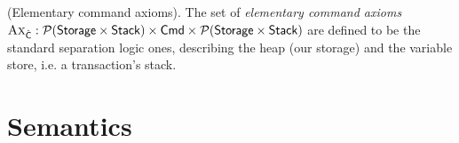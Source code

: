 \begin{defn}
	(Elementary command axioms).
	The set of \emph{elementary command axioms} $\textsc{Ax}_{\hat{\mathsf{C}}} : \mathcal{P}(\mathsf{Storage} \times \mathsf{Stack}) \times \mathsf{Cmd} \times \mathcal{P}(\mathsf{Storage} \times \mathsf{Stack})$ are defined to be the standard separation logic ones, describing the heap (our storage) and the variable store, i.e. a transaction's stack.

	\iffalse	
	For every rule's triple $\Delta \vdash \triple{P}{\hat{\mathds{C}}}{Q}$, logical environment $e \in \mathsf{LEnv}$ and predicate environment $\delta \in \mathsf{PEnv}$, we define the corresponding axiom as $\lfloor \tsem{P}_{e, \delta} \rfloor_W \times \hat{\mathds{C}} \times \lfloor \tsem{Q}_{e, \delta} \rfloor_W$.
	\begin{gather*}
		\infer[\textsc{Write}]
		{
			\vdash
			\triple
				{\mathds{E}_1 \mapsto -}
				{\pmutate{\mathds{E}_1}{\mathds{E}_2}}
				{\mathds{E}_1 \mapsto \mathds{E}_2}
		}
		{}
		\\
		\infer[\textsc{Read}]
		{
			\vdash
			\triple
				{\pvar{x} \doteq \mathds{E}_1 \sep \cell{\mathds{E}}{\mathds{E}_2}}
				{\pderef{\pvar{x}}{\mathds{E}}}
				{\pvar{x} \doteq \mathds{E}_2[\mathds{E}_1/\pvar{x}] \sep \cell{\mathds{E}[\mathds{E}_1/\pvar{x}]}{\mathds{E}_2[\mathds{E}_1/\pvar{x}]}}
		}
		{}
		\\
		\infer[\textsc{Assign}]
		{
			\vdash
			\triple
				{P}
				{\passign{\pvar{x}}{\mathds{E}}}
				{\exists x \ldotp \pvar{x} \doteq \mathds{E}[x/\pvar{x}] \sep P[x/\pvar{x}]}	
		}
		{}
		\\
		\infer[\textsc{Alloc}]
		{
			\vdash
			\triple
				{\mathtt{emp}}
				{\palloc{\pvar{x}}{\mathds{E}}}
				{\exists y \ldotp \pvar{x} \doteq y \sep \circledast_{0 \leq i < \mathds{E}} \left(\cell{y + i}{0}\right)}
		}
		{}
	\end{gather*}
	The listed axioms come directly from the ones in standard separation logic.
	\fi
\end{defn}

\section{Semantics}

\label{sec:transLogicSem}

